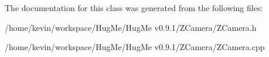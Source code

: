 The documentation for this class was generated from the following files:\begin{DoxyCompactItemize}
\item 
/home/kevin/workspace/HugMe/HugMe v0.9.1/ZCamera/ZCamera.h\item 
/home/kevin/workspace/HugMe/HugMe v0.9.1/ZCamera/ZCamera.cpp\end{DoxyCompactItemize}
